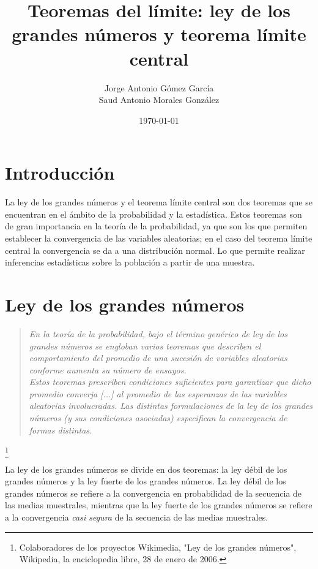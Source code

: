 \documentclass[8pt]{article}
\title{Teoremas del límite: ley de los grandes números y teorema límite central}
\author{Jorge Antonio Gómez García \\ Saud Antonio Morales González}
\date{\today}
\begin{document}
\maketitle
\tableofcontents
\pagebreak




\section{Introducción}

La ley de los grandes números y el teorema límite central son dos teoremas que se encuentran en el ámbito de la probabilidad y la estadística. Estos teoremas son de gran importancia en la teoría de la probabilidad, ya que son los que permiten establecer la convergencia de las variables aleatorias; en el caso del teorema límite central la convergencia se da a una distribución normal. Lo que permite realizar inferencias estadísticas sobre la población a partir de una muestra.

\pagebreak



\section{Ley de los grandes números}

\begin{quote}
    \textit{En la teoría de la probabilidad, bajo el término genérico de ley de los grandes números se engloban varios teoremas que describen el comportamiento del promedio de una sucesión de variables aleatorias conforme aumenta su número de ensayos. \vspace*{0.15cm} \\ Estos teoremas prescriben condiciones suficientes para garantizar que dicho promedio converja [...] al promedio de las esperanzas de las variables aleatorias involucradas. Las distintas formulaciones de la ley de los grandes números (y sus condiciones asociadas) especifican la convergencia de formas distintas.}
\end{quote}\footnote{Colaboradores de los proyectos Wikimedia, "Ley de los grandes números", Wikipedia, la enciclopedia libre, 28 de enero de 2006.}

La ley de los grandes números se divide en dos teoremas: la ley débil de los grandes números y la ley fuerte de los grandes números. La ley débil de los grandes números se refiere a la convergencia en probabilidad de la secuencia de las medias muestrales, mientras que la ley fuerte de los grandes números se refiere a la convergencia \textit{casi segura} de la secuencia de las medias muestrales.
\end{document}
